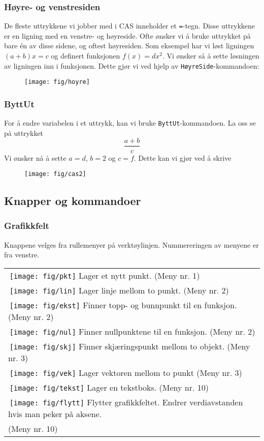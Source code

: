 \subsubsection{Høyre- og venstresiden \label{hogl}}
De fleste uttrykkene vi jobber med i CAS inneholder et \texttt{=}-tegn. Disse uttrykkene er en ligning med en venstre- og høyreside. Ofte ønsker vi å bruke uttrykket på bare én av disse sidene, og oftest høyresiden. Som eksempel har vi løst ligningen $ (a+b)x = c $ og definert funksjonen $ f(x)= d x^2 $. Vi ønsker så å sette løsningen av ligningen inn i funksjonen. Dette gjør vi ved hjelp av \texttt{HøyreSide}-kommandoen:
\begin{figure}
	\centering
	\texttt{[image: fig/hoyre]}
\end{figure}
\newpage
\subsubsection{ByttUt}
For å endre variabelen i et uttrykk, kan vi bruke \texttt{ByttUt}-kommandoen. La oss se på uttrykket
\[ \frac{a+b}{c} \]
Vi ønsker nå å sette $ {a=d }$, $ {b=2} $ og $ {c=f} $. Dette kan vi gjør ved å skrive
\begin{figure}
	\centering
	\texttt{[image: fig/cas2]}
\end{figure}	
\newpage
\subsection{Knapper og kommandoer}
\subsubsection*{Grafikkfelt}
Knappene velges fra rullemenyer på verktøylinjen. Nummereringen av menyene er fra venstre.\vsk

\begin{tabular}{@{}l}
	\,\texttt{[image: fig/pkt]} Lager et nytt punkt. (Meny nr. 1) \\
	\,\texttt{[image: fig/lin]} Lager linje mellom to punkt. (Meny nr. 2)\\	
	\,\texttt{[image: fig/ekst]} Finner topp- og bunnpunkt til en funksjon. (Meny nr. 2)\\
	\,\texttt{[image: fig/nul]} Finner nullpunktene til en funksjon. (Meny nr. 2)	\\
	\,\texttt{[image: fig/skj]} Finner skjæringspunkt mellom to objekt. (Meny nr. 3)\\	
	\,\texttt{[image: fig/vek]} Lager vektoren mellom to punkt (Meny nr. 3)\\		
	\,\texttt{[image: fig/tekst]} Lager en tekstboks. (Meny nr. 10)\\		
	\,\texttt{[image: fig/flytt]} Flytter grafikkfeltet. Endrer verdiavstanden hvis man peker på aksene. \\
	\hspace{1cm}(Meny nr. 10)\\			
\end{tabular}
